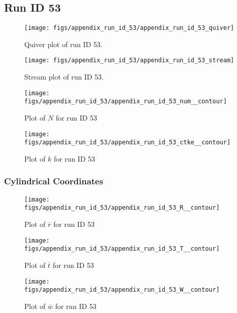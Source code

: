 \subsection{Run ID 53}
\begin{figure}[H]
\centering
\texttt{[image: figs/appendix\_run\_id\_53/appendix\_run\_id\_53\_quiver]}
\caption{Quiver plot of run ID 53.}
\label{fig:appendix_run_id_53_quiver}
\end{figure}


\begin{figure}[H]
\centering
\texttt{[image: figs/appendix\_run\_id\_53/appendix\_run\_id\_53\_stream]}
\caption{Stream plot of run ID 53.}
\label{fig:appendix_run_id_53_stream}
\end{figure}


\begin{figure}[H]
\centering
\texttt{[image: figs/appendix\_run\_id\_53/appendix\_run\_id\_53\_num\_\_contour]}
\caption{Plot of $N$ for run ID 53}
\label{fig:appendix_run_id_53_num__contour}
\end{figure}


\begin{figure}[H]
\centering
\texttt{[image: figs/appendix\_run\_id\_53/appendix\_run\_id\_53\_ctke\_\_contour]}
\caption{Plot of $k$ for run ID 53}
\label{fig:appendix_run_id_53_ctke__contour}
\end{figure}


\subsubsection{Cylindrical Coordinates}
\begin{figure}[H]
\centering
\texttt{[image: figs/appendix\_run\_id\_53/appendix\_run\_id\_53\_R\_\_contour]}
\caption{Plot of $\overline{r}$ for run ID 53}
\label{fig:appendix_run_id_53_R__contour}
\end{figure}


\begin{figure}[H]
\centering
\texttt{[image: figs/appendix\_run\_id\_53/appendix\_run\_id\_53\_T\_\_contour]}
\caption{Plot of $\overline{t}$ for run ID 53}
\label{fig:appendix_run_id_53_T__contour}
\end{figure}


\begin{figure}[H]
\centering
\texttt{[image: figs/appendix\_run\_id\_53/appendix\_run\_id\_53\_W\_\_contour]}
\caption{Plot of $\overline{w}$ for run ID 53}
\label{fig:appendix_run_id_53_W__contour}
\end{figure}


